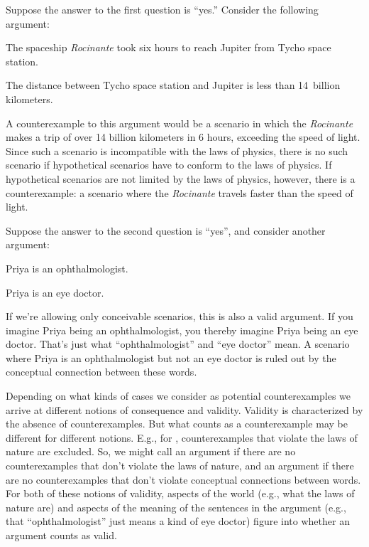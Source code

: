 Suppose the answer to the first question is ``yes.'' Consider the following argument:
	\begin{earg}
		\item[] The spaceship \textit{Rocinante} took six hours to reach Jupiter from Tycho space station.
		\item[\texttherefore] The distance between Tycho space station and Jupiter is less than 14~billion kilometers.
	\end{earg}
A counterexample to this argument would be a scenario in which the \textit{Rocinante} makes a trip of over 14 billion kilometers in 6 hours, exceeding the speed of light. Since such a scenario is incompatible with the laws of physics, there is no such scenario if hypothetical scenarios have to conform to the laws of physics.  If hypothetical scenarios are not limited by the laws of physics, however, there is a counterexample: a scenario where the \textit{Rocinante} travels faster than the speed of light.

Suppose the answer to the second question is ``yes'', and consider another argument:
	\begin{earg}
		\item[] Priya is an ophthalmologist.
		\item[\texttherefore] Priya is an eye doctor.
	\end{earg}
If we're allowing only conceivable scenarios, this is also a valid argument. If you imagine Priya being an ophthalmologist, you thereby imagine Priya being an eye doctor. That's just what ``ophthalmologist'' and ``eye doctor'' mean.  A scenario where Priya is an ophthalmologist but not an eye doctor is ruled out by the conceptual connection between these words.

Depending on what kinds of cases we consider as potential
counterexamples we arrive at different notions of consequence and
validity. Validity is characterized by the absence of counterexamples.
But what counts as a counterexample may be different for different
notions. E.g., for , counterexamples that
violate the laws of nature are excluded. So, we might call an argument
 if there are no counterexamples that
don't violate the laws of nature, and an argument  if there are no counterexamples that don't violate conceptual
connections between words. For both of these notions of validity,
aspects of the world (e.g., what the laws of nature are) and aspects
of the meaning of the sentences in the argument (e.g., that
``ophthalmologist'' just means a kind of eye doctor) figure into
whether an argument counts as valid.

